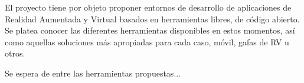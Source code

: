 
El proyecto tiene por objeto proponer entornos de desarrollo de aplicaciones de Realidad Aumentada y Virtual basados en herramientas libres, de código abierto. Se platea conocer las diferentes herramientas disponibles en estos momentos, así como aquellas soluciones más apropiadas para cada caso, móvil, gafas de RV u otros.

Se espera de entre las herramientas propuestas...